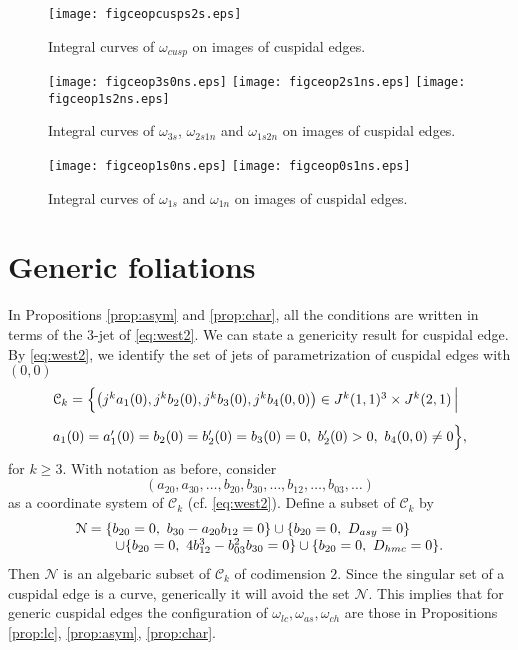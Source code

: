 \documentclass[a4paper, 12pt]{article}
\theoremstyle{definition}
\numberwithin{equation}{section}
\begin{document}
\begin{figure}[!ht]
\centering
\texttt{[image: figceopcusps2s.eps]}
\caption{Integral curves of
$\omega_{cusp}$
on images of cuspidal edges.}
\label{fig:cecusp}
\end{figure}
\begin{figure}[!ht]
\centering
\texttt{[image: figceop3s0ns.eps]}
\hspace{1mm}
\texttt{[image: figceop2s1ns.eps]}
\hspace{1mm}
\texttt{[image: figceop1s2ns.eps]}
\caption{Integral curves of
$\omega_{3s}$,  $\omega_{2s1n}$ and $\omega_{1s2n}$ 
on images of cuspidal edges.}
\label{fig:ce2}
\end{figure}
\begin{figure}[!ht]
\centering
\texttt{[image: figceop1s0ns.eps]}
\hspace{1mm}
\texttt{[image: figceop0s1ns.eps]}
\caption{Integral curves of
$\omega_{1s}$ and $\omega_{1n}$ on 
images of cuspidal edges.}
\label{fig:ce3}
\end{figure}

\section{Generic foliations}
In 
Propositions \ref{prop:asym} and \ref{prop:char}, 
all the conditions are written in
terms of the $3$-jet of \eqref{eq:west2}.
We can state a genericity result for cuspidal edge.
By \eqref{eq:west2}, we identify the set of jets
of parametrization of cuspidal edges
with $(0,0)$
$$
\begin{array}{l}
{\mathcal{C}}_k=\Big\{\big(j^ka_1(0),j^kb_2(0),j^kb_3(0),j^kb_4(0,0)\big)
\in J^k(1,1)^3\times J^k(2,1)
\,\Big|\,\\[4mm]
\hspace{0mm}
a_1(0)=a_1'(0)=b_2(0)=b_2'(0)=b_3(0)=0,\ 
b_2'(0)>0,\ b_4(0,0)\ne0\Big\},
\end{array}
$$
for $k\geq3$.
With notation as before, consider
$$(a_{20},a_{30},\ldots,b_{20},b_{30},
\ldots,b_{12},\ldots,b_{03},\ldots)$$
as a coordinate system of ${\mathcal{C}}_k$ (cf. \eqref{eq:west2}).
Define a subset of ${\mathcal{C}}_k$ by
$$
\begin{array}{l}
{\mathcal{N}}
=
\{b_{20}=0,\ b_{30}-a_{20}b_{12}=0\}
\cup
\{b_{20}=0,\ D_{asy}=0\}\\
\hspace{10mm}
\cup
\{b_{20}=0,\ 4b_{12}^3-b_{03}^2b_{30}=0\}
\cup
\{b_{20}=0,\ D_{hmc}=0\}.
\end{array}
$$
Then ${\mathcal{N}}$ is an algebaric subset of ${\mathcal{C}}_k$ of
codimension $2$.
Since the singular set of a cuspidal edge 
is a curve, generically it will avoid the set ${\mathcal{N}}$.
This implies that for generic cuspidal edges
the configuration of $\omega_{lc},\omega_{as},\omega_{ch}$
are those in Propositions
\ref{prop:lc}, 
\ref{prop:asym}, 
\ref{prop:char}.
\appendix
\end{document}
